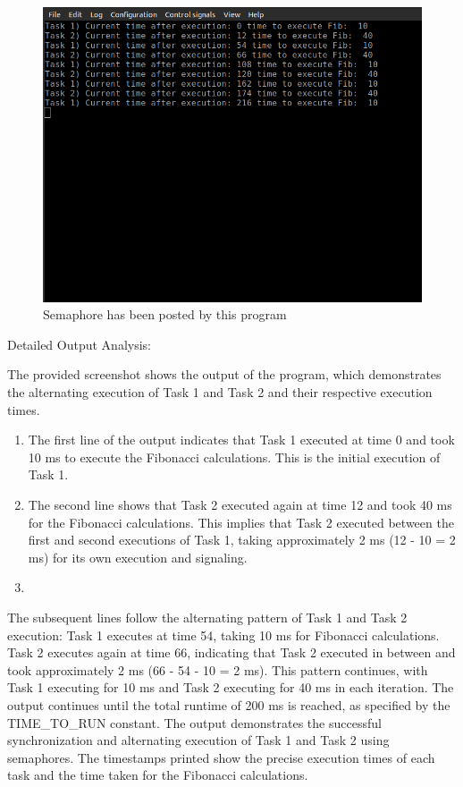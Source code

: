 \documentclass[a4paper,11pt]{article}%
\newenvironment{qanda}{\setlength{\parindent}{0pt}}{\bigskip}
\begin{document}
\begin{qanda}
\begin{enumerate}
\begin{itemize}
	\end{itemize}
	
	
\end{enumerate}




\begin{figure}[!h]
	\centering
	\includegraphics[scale=0.6]{figures/q2.png}
	\caption{Semaphore has been posted by this program}

\end{figure}

Detailed Output Analysis:

The provided screenshot shows the output of the program, which demonstrates the alternating execution of Task 1 and Task 2 and their respective execution times.
\begin{enumerate}
	\item The first line of the output indicates that Task 1 executed at time 0 and took 10 ms to execute the Fibonacci calculations. This is the initial execution of Task 1.
	\item The second line shows that Task 2 executed again at time 12 and took 40 ms for the Fibonacci calculations. This implies that Task 2 executed between the first and second executions of Task 1, taking approximately 2 ms (12 - 10 = 2 ms) for its own execution and signaling.
	\item 
\end{enumerate}


The subsequent lines follow the alternating pattern of Task 1 and Task 2 execution:
Task 1 executes at time 54, taking 10 ms for Fibonacci calculations.
Task 2 executes again at time 66, indicating that Task 2 executed in between and took approximately 2 ms (66 - 54 - 10 = 2 ms).
This pattern continues, with Task 1 executing for 10 ms and Task 2 executing for 40 ms in each iteration.
The output continues until the total runtime of 200 ms is reached, as specified by the TIME\_TO\_RUN constant.
The output demonstrates the successful synchronization and alternating execution of Task 1 and Task 2 using semaphores. The timestamps printed show the precise execution times of each task and the time taken for the Fibonacci calculations.\\


\end{qanda}
\end{document}
